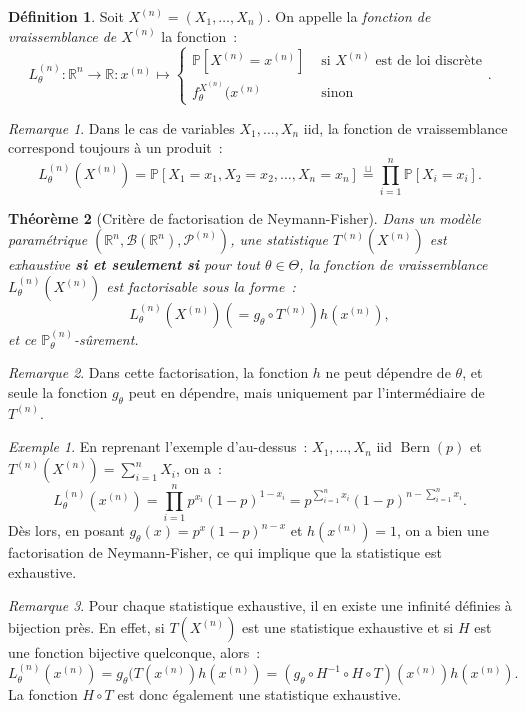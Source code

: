 \documentclass{report}
\DeclareMathOperator{\Bern}{Bern}  %
\renewcommand{\P}{\mathbb P}
\newcommand{\statmod}[4]{\left(#1^{#4}, #2\left(#1^{#4}\right), #3^{\left(#4\right)}\right)}
\newcommand{\R}{\mathbb R}
\newcommand{\Brl}{\mathcal B}  %
\newtheorem{thm}{Théorème}[chapter]
\theoremstyle{definition}
\newtheorem{déf}[thm]{Définition}
\theoremstyle{remark}
\newtheorem*{rmq}{Remarque}
\newtheorem{ex}{Exemple}[chapter]
\begin{document}
		\begin{déf} Soit $X^{(n)} = (X_1, \ldots, X_n)$. On appelle la \textit{fonction de vraissemblance de $X^{(n)}$} la fonction~:
		\[L_\theta^{(n)} : \R^n \to \R : x^{(n)} \mapsto \begin{cases}\P[X^{(n)}
			= x^{(n)}] &\text{ si $X^{(n)}$ est de loi discrète} \\f_\theta^{X^{(n)}}(x^{(n)} &\text{ sinon}\end{cases}.\]
		\end{déf}

		\begin{rmq} Dans le cas de variables $X_1, \ldots, X_n$ iid, la fonction de vraissemblance correspond toujours à un produit~:
		\[L_\theta^{(n)}(X^{(n)}) = \P[X_1 = x_1, X_2 = x_2, \ldots, X_n = x_n] \overset \sqcup= \prod_{i=1}^n\P[X_i = x_i].\]
		\end{rmq}

		\begin{thm}[Critère de factorisation de Neymann-Fisher] Dans un modèle paramétrique $\statmod \R\Brl{\mathcal P}n$, une statistique $T^{(n)}(X^{(n)})$ est
		exhaustive \textbf{si et seulement si} pour tout $\theta \in \Theta$, la fonction de vraissemblance $L_\theta^{(n)}(X^{(n)})$ est factorisable sous la forme~:
		\[L_\theta^{(n)}(X^{(n)}) \left(= g_\theta \circ T^{(n)}\right) h(x^{(n)}),\]
		et ce $\P_\theta^{(n)}$-sûrement.
		\end{thm}

		\begin{rmq} Dans cette factorisation, la fonction $h$ ne peut dépendre de $\theta$, et seule la fonction $g_\theta$ peut en dépendre, mais uniquement par
		l'intermédiaire de $T^{(n)}$.
		\end{rmq}

		\begin{ex} En reprenant l'exemple d'au-dessus~: $X_1, \ldots, X_n$ iid $\Bern(p)$ et $T^{(n)}(X^{(n)}) = \sum_{i=1}^nX_i$, on a~:
		\[L_\theta^{(n)}(x^{(n)}) = \prod_{i=1}^np^{x_i}(1-p)^{1-x_i} = p^{\sum_{i=1}^nx_i}(1-p)^{n - \sum_{i=1}^nx_i}.\]
		Dès lors, en posant $g_\theta(x) = p^x(1-p)^{n-x}$ et $h(x^{(n)}) = 1$, on a bien une factorisation de Neymann-Fisher, ce qui implique que la statistique
		est exhaustive.
		\end{ex}

		\begin{rmq} Pour chaque statistique exhaustive, il en existe une infinité définies à bijection près. En effet, si $T(X^{(n)})$ est une statistique exhaustive
		et si $H$ est une fonction bijective quelconque, alors~:
		\[L_\theta^{(n)}(x^{(n)}) = g_\theta(T(x^{(n)})h(x^{(n)}) = (g_\theta \circ H^{-1} \circ H \circ T)(x^{(n)})h(x^{(n)}).\]
		La fonction $H \circ T$ est donc également une statistique exhaustive.
		\end{rmq}
\end{document}
